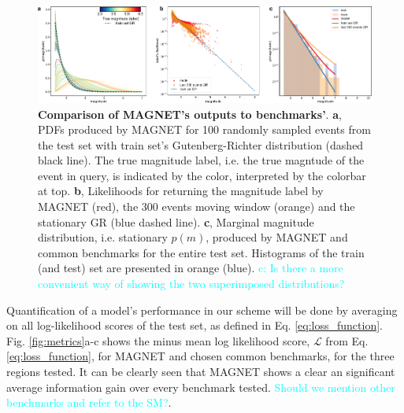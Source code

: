 \documentclass[pdflatex]{sn-jnl}
\newcommand{\neri}[1]{{\textcolor{cyan}{#1}}}
\begin{document}
\begin{figure}[h!]
    \centering
    \includegraphics[width=1\textwidth]{figures/raw_results_hauksson.pdf}
    \caption{
        \textbf{Comparison of MAGNET's outputs to benchmarks'}. \textbf{a}, PDFs produced by MAGNET for 100 randomly sampled events from the test set with train set's Gutenberg-Richter distribution (dashed black line). The true magnitude label, i.e. the true magntude of the event in query, is indicated by the color, interpreted by the colorbar at top. \textbf{b}, Likelihoods for returning the magnitude label by MAGNET (red), the 300 events moving window (orange) and the stationary GR (blue dashed line). \textbf{c}, Marginal magnitude distribution, i.e. stationary $p(m)$, produced by MAGNET and common benchmarks for the entire test set. Histograms of the train (and test) set are presented in orange (blue). \neri{c: Is there a more convenient way of showing the two superimposed distributions?}
    }
    \label{fig:model_output}
\end{figure}


Quantification of a model's performance in our scheme will be done by averaging on all log-likelihood scores of the test set, as defined in Eq. \ref{eq:loss_function}. Fig. \ref{fig:metrics}a-c shows the minus mean log likelihood score, $\mathcal{L}$ from Eq. \ref{eq:loss_function}, for MAGNET and chosen common benchmarks, for the three regions tested. It can be clearly seen that MAGNET shows a clear an significant average information gain over every benchmark tested. \neri{Should we mention other benchmarks and refer to the SM?}. 
\end{document}
